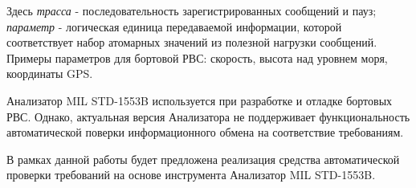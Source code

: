Здесь \textit{трасса} - последовательность зарегистрированных сообщений и пауз; 
\textit{параметр} - логическая единица передаваемой информации, которой 
соответствует набор атомарных значений из полезной нагрузки сообщений. Примеры 
параметров для бортовой РВС: скорость, высота над уровнем моря, координаты GPS.


Анализатор MIL STD-1553B используется при разработке и отладке бортовых РВС. 
Однако, актуальная версия Анализатора не поддерживает функциональность 
автоматической поверки информационного обмена на соответствие требованиям.

В рамках данной работы будет предложена реализация средства автоматической 
проверки требований на основе инструмента Анализатор MIL STD-1553B.